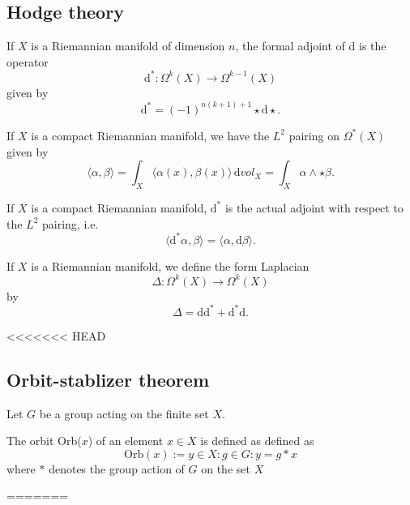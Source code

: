 \documentclass[12pt,letterpaper,reqno]{article}
\numberwithin{equation}{section}
\newcommand{\de}{\mathrm{d}}
\newcommand{\IP}[1]{\langle#1\rangle}
\newcommand{\fixme}[1]{{\color{orange}{[#1]}}}
\begin{document}
\subsection{Hodge theory}

\begin{defn}[Formal adjoint of $\de$]
If $X$ is a Riemannian manifold of dimension $n$,
the formal adjoint of $\de$
is the operator
\begin{equation}
  \de^*: \Omega^{k}(X) \to \Omega^{k-1}(X)
\end{equation}
given by
\begin{equation}
  \de^* = (-1)^{n(k+1)+1} \star \de \star.
\end{equation}
\end{defn}

If $X$ is a compact Riemannian manifold, we have
the $L^2$ pairing on $\Omega^*(X)$ given by
\begin{equation}
  \IP{\alpha,\beta} = \int_X \IP{\alpha(x),\beta(x)} \, \de vol_X = \int_X \alpha \wedge \star \beta.
\end{equation}

\begin{lem}
If $X$ is a compact Riemannian manifold, $\de^*$ is the actual adjoint
with respect to the $L^2$ pairing, i.e.
\begin{equation}
  \IP{\de^* \alpha,\beta} = \IP{\alpha,\de \beta}.
\end{equation}
\end{lem}

\begin{defn}
If $X$ is a Riemannian manifold, we define the form Laplacian
\begin{equation}
  \Delta: \Omega^k(X) \to \Omega^k(X)
\end{equation}
by
\begin{equation} \label{eq:form-laplacian}
  \Delta = \de \de^* + \de^* \de.
\end{equation}
\end{defn}
\fixme{...}

<<<<<<< HEAD
\subsection{Orbit-stablizer theorem}
Let $G$ be a group acting on the finite set $X$. 
\begin{defn}
  The orbit Orb($x$) of an element $x\in X$ is defined as defined as 
  \begin{equation}
    \text{Orb}(x):={y\in X:g\in G:y=g*x}
  \end{equation}
where $*$ denotes the group action of $G$ on the set $X$
\end{defn}
=======
\end{document}
